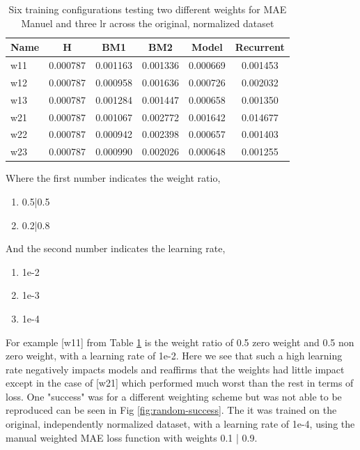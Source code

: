 \begin{table}[htbp]
	\centering
	\caption{Six training configurations testing two different weights for MAE Manuel and three lr across the original, normalized dataset}
	\label{tab:weighte_lr}
	\begin{tabular}{p{2cm}ccccc}
		\toprule
		Name &  H &  BM1 &  BM2 &  Model &  Recurrent \\
		\midrule
		w11 &       0.000787 &        0.001163 &        0.001336 &   0.000669 &            0.001453 \\
		w12 &       0.000787 &        0.000958 &        0.001636 &   0.000726 &            0.002032 \\
		w13 &       0.000787 &        0.001284 &        0.001447 &   0.000658 &            0.001350 \\
		w21 &       0.000787 &        0.001067 &        0.002772 &   0.001642 &            0.014677 \\
		w22 &       0.000787 &        0.000942 &        0.002398 &   0.000657 &            0.001403 \\
		w23 &       0.000787 &        0.000990 &        0.002026 &   0.000648 &            0.001255 \\
		\bottomrule
	\end{tabular}
\end{table}

Where the first number indicates the weight ratio,
\begin{enumerate}
	\item 0.5|0.5
	\item  0.2|0.8
\end{enumerate}

And the second number indicates the learning rate,
\begin{enumerate}
	\item  1e-2
	\item  1e-3
	\item  1e-4
\end{enumerate}
For example [w11] from Table \ref{tab:weighte_lr} is the weight ratio of 0.5 zero weight and 0.5 non zero weight, with a learning rate of 1e-2. Here we see that such a high learning rate negatively impacts models and reaffirms that the weights had little impact except in the case of [w21] which performed much worst than the rest in terms of loss. One "success" was for a different weighting scheme but was not able to be reproduced  can be seen in Fig \ref{fig:random-success}. The it was trained on the original, independently normalized dataset, with a learning rate of 1e-4, using the manual weighted MAE loss function with weights 0.1 | 0.9.

